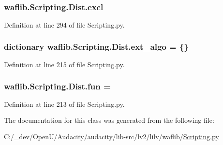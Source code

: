 \subsubsection[{\texorpdfstring{excl}{excl}}]{\setlength{\rightskip}{0pt plus 5cm}waflib.\+Scripting.\+Dist.\+excl}\hypertarget{classwaflib_1_1_scripting_1_1_dist_a5b9ee4e1f49dbd813f415c8f7aa293cc}{}\label{classwaflib_1_1_scripting_1_1_dist_a5b9ee4e1f49dbd813f415c8f7aa293cc}


Definition at line 294 of file Scripting.\+py.

\subsubsection[{\texorpdfstring{ext\+\_\+algo}{ext_algo}}]{\setlength{\rightskip}{0pt plus 5cm}dictionary waflib.\+Scripting.\+Dist.\+ext\+\_\+algo = \{\}\hspace{0.3cm}{\ttfamily [static]}}\hypertarget{classwaflib_1_1_scripting_1_1_dist_a5347d2e30c6bedc159e8eb97b756add8}{}\label{classwaflib_1_1_scripting_1_1_dist_a5347d2e30c6bedc159e8eb97b756add8}


Definition at line 215 of file Scripting.\+py.

\subsubsection[{\texorpdfstring{fun}{fun}}]{ waflib.\+Scripting.\+Dist.\+fun = \textquotesingle{}\hspace{0.3cm}{\ttfamily [static]}}\hypertarget{classwaflib_1_1_scripting_1_1_dist_ae6e4243f83b8e73a9f995929fb80179e}{}\label{classwaflib_1_1_scripting_1_1_dist_ae6e4243f83b8e73a9f995929fb80179e}


Definition at line 213 of file Scripting.\+py.



The documentation for this class was generated from the following file\+:\begin{DoxyCompactItemize}
\item 
C\+:/\+\_\+dev/\+Open\+U/\+Audacity/audacity/lib-\/src/lv2/lilv/waflib/\hyperlink{lilv_2waflib_2_scripting_8py}{Scripting.\+py}\end{DoxyCompactItemize}

